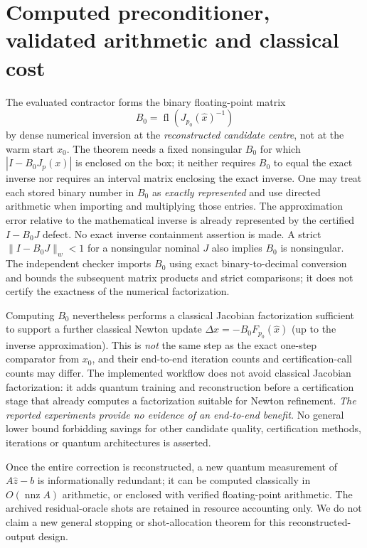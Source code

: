 \documentclass[11pt,a4paper]{article}
\theoremstyle{remark}\newtheorem{remark}[theorem]{Remark}
\begin{document}
\section{Computed preconditioner, validated arithmetic and classical cost}\label{sec:precond}
The evaluated contractor forms the binary floating-point matrix
\begin{equation}\label{eq:preconditioner}
B_0=\operatorname{fl}\!\left(J_{p_0}(\widehat x)^{-1}\right)
\end{equation}
by dense numerical inversion at the \emph{reconstructed candidate centre}, not at the warm start $x_0$. The theorem needs a fixed nonsingular $B_0$ for which $|I-B_0J_p(x)|$ is enclosed on the box; it neither requires $B_0$ to equal the exact inverse nor requires an interval matrix enclosing the exact inverse. One may treat each stored binary number in $B_0$ as \emph{exactly represented} and use directed arithmetic when importing and multiplying those entries. The approximation error relative to the mathematical inverse is already represented by the certified $I-B_0J$ defect. No exact inverse containment assertion is made. A strict $\|I-B_0J\|_w<1$ for a nonsingular nominal $J$ also implies $B_0$ is nonsingular. The independent checker imports $B_0$ using exact binary-to-decimal conversion and bounds the subsequent matrix products and strict comparisons; it does not certify the exactness of the numerical factorization.

Computing $B_0$ nevertheless performs a classical Jacobian factorization sufficient to support a further classical Newton update $\Delta x=-B_0F_{p_0}(\widehat x)$ (up to the inverse approximation). This is \emph{not} the same step as the exact one-step comparator from $x_0$, and their end-to-end iteration counts and certification-call counts may differ. The implemented workflow does not avoid classical Jacobian factorization: it adds quantum training and reconstruction before a certification stage that already computes a factorization suitable for Newton refinement. \emph{The reported experiments provide no evidence of an end-to-end benefit.} No general lower bound forbidding savings for other candidate quality, certification methods, iterations or quantum architectures is asserted.

Once the entire correction is reconstructed, a new quantum measurement of $A\widehat z-b$ is informationally redundant; it can be computed classically in $O(\operatorname{nnz}A)$ arithmetic, or enclosed with verified floating-point arithmetic. The archived residual-oracle shots are retained in resource accounting only. We do not claim a new general stopping or shot-allocation theorem for this reconstructed-output design.
\end{document}
